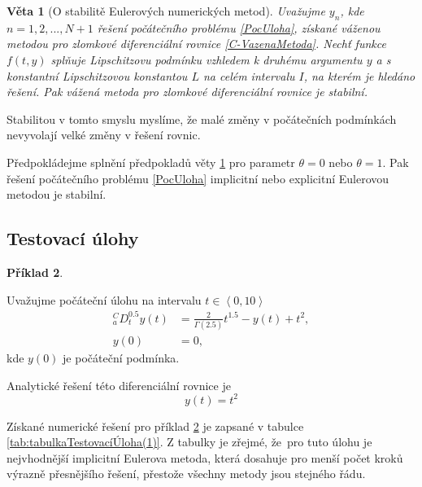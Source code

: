 \documentclass[a4paper,12pt,twoside]{article}
\newtheorem{veta}{Věta}[section]
\theoremstyle{definition}
\newtheorem{prikl}[veta]{Příklad}
\theoremstyle{remark}
\numberwithin{equation}{section}
\numberwithin{table}{section}
\numberwithin{figure}{section}
\begin{document}
\begin{veta} [O stabilitě Eulerových numerických metod] \label{StabilityOfEuler}
	Uvažujme $y_{n}$, kde $n = 1,2,...,N+1$ řešení počátečního problému \eqref{PocUloha}, získané váženou metodou pro zlomkové diferenciální rovnice \eqref{C-VazenaMetoda}. Nechť funkce $f\left(t,y\right)$ splňuje Lipschitzovu podmínku vzhledem k druhému argumentu $y$ a s konstantní Lipschitzovou konstantou $L$ na celém intervalu $I$, na kterém je hledáno řešení. Pak vážená metoda pro zlomkové diferenciální rovnice je stabilní.
\end{veta}
Stabilitou v tomto smyslu myslíme, že  malé změny v počátečních podmínkách nevyvolají velké změny v řešení rovnic.

Předpokládejme splnění předpokladů věty \ref{StabilityOfEuler} pro parametr $\theta = 0$ nebo $\theta = 1$. Pak řešení počátečního problému \eqref{PocUloha} implicitní nebo explicitní Eulerovou metodou je stabilní.



\subsection{Testovací úlohy}

	\begin{prikl}\label{TestovaciUloha1}

	Uvažujme počáteční úlohu na intervalu $ t \in \left\langle 0,10\right\rangle$
	\begin{equation}
		\begin{aligned}
			^{C}_{a}D_{t}^{0.5} y\left(t\right) &= \frac{2}{\Gamma\left(2.5\right)}t^{1.5} - y\left(t\right) + t^{2}, \\
			y\left(0\right) &= 0,
		\end{aligned} 
	\end{equation}
	kde $y\left(0\right)$ je počáteční podmínka. 

	Analytické řešení této diferenciální rovnice je \cite{LiYe}
	\begin{equation}
		y \left(t\right) = t^{2} 
	\end{equation}

	Získané numerické řešení pro příklad \ref{TestovaciUloha1} je zapsané v tabulce \ref{tab:tabulkaTestovacíÚloha(1)}. Z tabulky je zřejmé, že~pro tuto úlohu je nejvhodnější implicitní Eulerova metoda, která dosahuje pro menší počet kroků výrazně přesnějšího řešení, přestože všechny metody jsou stejného řádu.
\end{prikl}
\end{document}
